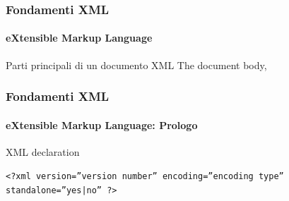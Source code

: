 \begin{frame}
	\frametitle{Fondamenti XML}
	\framesubtitle{eXtensible Markup Language}
	\addtocounter{nframe}{1}

	\begin{block}{Parti principali di un documento XML}
        The document body, %
	\end{block}

\end{frame}

\begin{frame}
	\frametitle{Fondamenti XML}
	\framesubtitle{eXtensible Markup Language: Prologo}
	\addtocounter{nframe}{1}

	\begin{block}{XML declaration}
    \begin{center}\texttt{<?xml version=”version number” encoding=”encoding type” standalone=”yes|no” ?>}\end{center}
	\end{block}

\end{frame}





